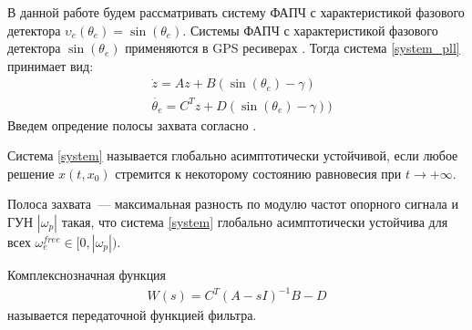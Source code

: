 \documentclass[a4paper,article,14pt]{extarticle}
\begin{document}
В данной работе будем рассматривать систему ФАПЧ с характеристикой фазового детектора $\upsilon_e(\theta_e) = \operatorname{sin}(\theta_e)$. Системы ФАПЧ с характеристикой фазового детектора $\operatorname{sin}(\theta_e)$ применяются в GPS ресиверах \cite{kaplan}. Тогда система \eqref{system_pll} принимает вид:
 \begin{equation}\label{system}
 \begin{aligned}
 &\dot{z} = Az + B(\operatorname{sin}(\theta_e) - \gamma)\\
 &\dot{\theta_e} = C^Tz + D(\operatorname{sin}(\theta_e) - \gamma))
 \end{aligned}
\end{equation}
Введем опредение полосы захвата согласно \cite{kuznetsov_article}.
\begin{definition}
Система \eqref{system} называется глобально асимптотически устойчивой, если любое решение $x(t, x_0)$  стремится к некоторому состоянию равновесия при $t \rightarrow +\infty$.
\end{definition}

\begin{definition}
Полоса захвата~--- максимальная разность по модулю частот опорного сигнала и ГУН $|\omega_p|$ такая, что система \eqref{system} глобально асимптотически устойчива для всех $\omega_e^{free} \in [0, |\omega_p|)$.
\end{definition}

\begin{definition}
Комплекснозначная функция  
\begin{equation}
 \begin{aligned}
 W(s)=C^T \left(A-sI\right)^{-1}B - D
 \end{aligned}
\end{equation}
называется передаточной функцией фильтра.
\end{definition}
\end{document}
